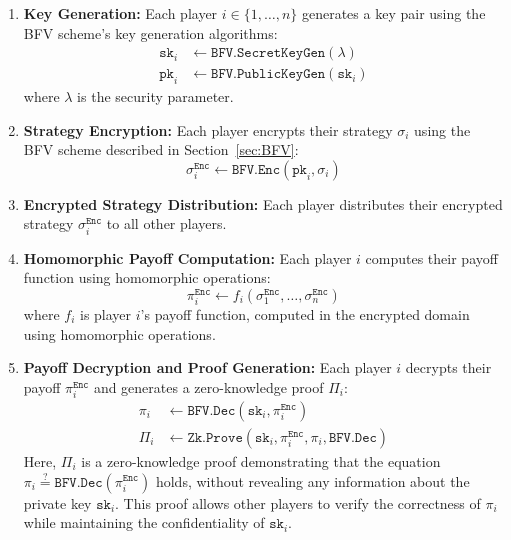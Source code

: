 \documentclass[11pt]{article}
\newcommand{\eqq}{\stackrel{?}{=}}
\begin{document}
\begin{enumerate}
  \item \textbf{Key Generation:} Each player $i \in \{1, \ldots, n\}$ generates a key pair using the BFV scheme's key generation algorithms:
    \begin{align}
      \texttt{sk}_i &\leftarrow \texttt{BFV.SecretKeyGen}(\lambda) \\
      \texttt{pk}_i &\leftarrow \texttt{BFV.PublicKeyGen}(\texttt{sk}_i)
    \end{align}
    where $\lambda$ is the security parameter.
  
  \item \textbf{Strategy Encryption:} Each player encrypts their strategy $\sigma_i$ using the BFV scheme described in Section~\ref{sec:BFV}:
    \begin{equation}
      \sigma^\texttt{Enc}_i \leftarrow \texttt{BFV.Enc}(\texttt{pk}_i, \sigma_i)
    \end{equation}
  
  \item \textbf{Encrypted Strategy Distribution:} Each player distributes their encrypted strategy $\sigma^\texttt{Enc}_i$ to all other players.
  
  \item \textbf{Homomorphic Payoff Computation:} Each player $i$ computes their payoff function using homomorphic operations:
    \begin{equation}
      \pi^\texttt{Enc}_i \leftarrow f_i(\sigma^\texttt{Enc}_1, \ldots, \sigma^\texttt{Enc}_n)
    \end{equation}
    where $f_i$ is player $i$'s payoff function, computed in the encrypted domain using homomorphic operations.
  
  \item \textbf{Payoff Decryption and Proof Generation:} Each player $i$ decrypts their payoff $\pi^\texttt{Enc}_i$ and generates a zero-knowledge proof $\Pi_i$:
    \begin{align}
      \pi_i &\leftarrow \texttt{BFV.Dec}(\texttt{sk}_i, \pi^\texttt{Enc}_i) \\
      \Pi_i &\leftarrow \texttt{Zk.Prove}(\texttt{sk}_i, \pi^\texttt{Enc}_i, \pi_i, \texttt{BFV.Dec})
    \end{align}
    Here, $\Pi_i$ is a zero-knowledge proof demonstrating that the equation $\pi_i \eqq \texttt{BFV.Dec}(\pi^\texttt{Enc}_i)$ holds, without revealing any information about the private key $\texttt{sk}_i$. This proof allows other players to verify the correctness of $\pi_i$ while maintaining the confidentiality of $\texttt{sk}_i$.
\end{enumerate}
\end{document}

